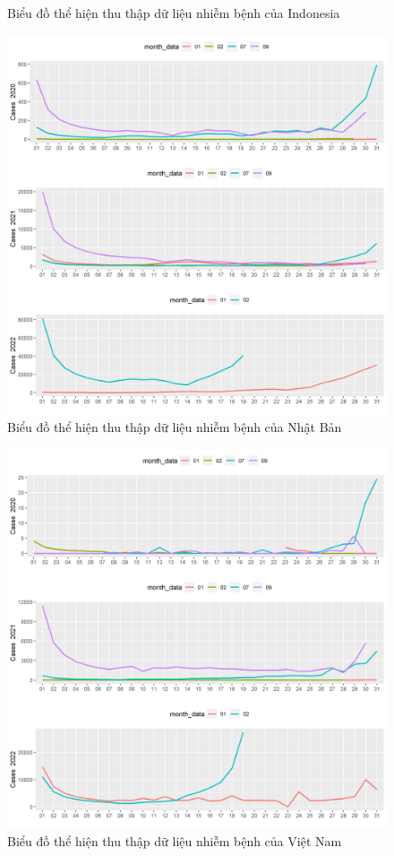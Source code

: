 \documentclass[a4paper]{article}
\theoremstyle{definition}
\begin{document}
\begin{enumerate}[i)]
\begin{enumerate}[1)]
\begin{figure}[htp]
		    \caption{Biểu đồ thể hiện thu thập dữ liệu nhiễm bệnh của Indonesia}
		    \label{fig:my_label}
		\end{figure}
		\begin{figure}[htp]
		    \centering
		    \includegraphics[scale = 0.7]{Images/VI/vi1 Japan .jpeg}
		    \caption{Biểu đồ thể hiện thu thập dữ liệu nhiễm bệnh của Nhật Bản}
		    \label{fig:my_label}
		\end{figure}
		\begin{figure}[htp]
		    \centering
		    \includegraphics[scale = 0.7]{Images/VI/vi1 Vietnam .jpeg} 
		    \caption{Biểu đồ thể hiện thu thập dữ liệu nhiễm bệnh của Việt Nam}
		    \label{fig:my_label}
		 \end{figure}
		 \newpage


\end{enumerate}
\end{enumerate}
\end{document}
